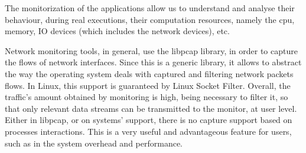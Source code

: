 \abstract 




The monitorization of the applications allow us to understand and analyse their behaviour, during real executions, their computation resources, namely the cpu, memory, IO devices (which includes the network devices), etc.

Network monitoring tools, in general, use the libpcap library, in order to capture the flows of network interfaces.
Since this is a generic library, it allows to abstract the way the operating system deals with captured and filtering network packets flows.
In Linux, this support is guaranteed by Linux Socket Filter.
Overall, the traffic’s amount obtained by monitoring is high, being necessary to filter it, so that only relevant data streams can be transmitted to the monitor, at user level.
Either in libpcap, or on systems’ support, there is no capture support based on processes interactions.
This is a very useful and advantageous feature for users, such as in the system overhead and performance.
 
